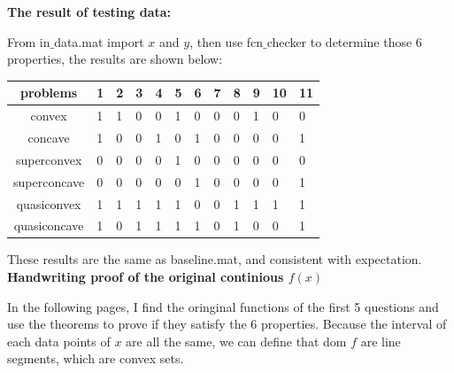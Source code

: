 \documentclass[a4paper, onecolumn, , 11pt]{IEEEtran}
\begin{document}
    \noindent \textbf{The result of testing data:}

        From in$\_$data.mat import $x$ and $y$, then use fcn$\_$checker to 
        determine those 6 properties, the results are shown below:

        \begin{table}[h]
        \centering
        \renewcommand{\arraystretch}{1.3}
        \begin{tabular}{|c||p{0.8cm}|p{0.8cm}|p{0.8cm}|p{0.8cm}|p{0.8cm}|p{0.8cm}|p{0.8cm}|p{0.8cm}|p{0.8cm}|p{0.8cm}|p{0.8cm}|}
            \hline
            problems     &1&2&3&4&5&6&7&8&9&10&11 \\
            \hline \hline
            convex       &1&1&0&0&1&0&0&0&1&0&0 \\ \hline
            concave      &1&0&0&1&0&1&0&0&0&0&1 \\ \hline
            superconvex  &0&0&0&0&1&0&0&0&0&0&0 \\ \hline
            superconcave &0&0&0&0&0&1&0&0&0&0&1 \\ \hline
            quasiconvex  &1&1&1&1&1&0&0&1&1&1&1 \\ \hline
            quasiconcave &1&0&1&1&1&1&0&1&0&0&1 \\ \hline
        \end{tabular}
        \end{table}

        These results are the same as baseline.mat, and consistent with
        expectation.\\ 

    \noindent \textbf{Handwriting proof of the original continious $f(x)$}

        In the following pages, I find the oringinal functions of the first
        5 questions and use the theorems to prove if they satisfy the 6 
        properties. Because the interval of each data points of $x$ are 
        all the same, we can define that dom $f$ are line segments, which are
        convex sets. 
    
\end{document}
